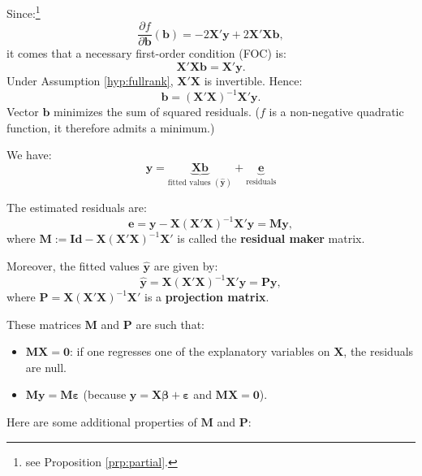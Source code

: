 \documentclass[
  11pt,
]{book}
\providecommand{\tightlist}{%
  \setlength{\itemsep}{0pt}\setlength{\parskip}{0pt}}
\theoremstyle{definition}
\theoremstyle{definition}
\theoremstyle{definition}
\theoremstyle{definition}
\theoremstyle{remark}
\begin{document}
Since:\footnote{see Proposition \ref{prp:partial}.}
\[
\frac{\partial f}{\partial \mathbf{b}}(\mathbf{b}) = - 2 \mathbf{X}'\mathbf{y} + 2 \mathbf{X}'\mathbf{X}\mathbf{b},
\]
it comes that a necessary first-order condition (FOC) is:
\begin{equation}
\mathbf{X}'\mathbf{X}\mathbf{b} = \mathbf{X}'\mathbf{y}.\label{eq:OLSFOC}
\end{equation}
Under Assumption \ref{hyp:fullrank}, \(\mathbf{X}'\mathbf{X}\) is invertible. Hence:
\[
\boxed{\mathbf{b} = (\mathbf{X}'\mathbf{X})^{-1} \mathbf{X}'\mathbf{y}.}
\]
Vector \(\mathbf{b}\) minimizes the sum of squared residuals. (\(f\) is a non-negative quadratic function, it therefore admits a minimum.)

We have:
\[
\mathbf{y} = \underbrace{\mathbf{X}\mathbf{b}}_{\mbox{fitted values } (\hat{\mathbf{y}})} + \underbrace{\mathbf{e}}_{\mbox{residuals}}
\]

The estimated residuals are:
\begin{equation}
\mathbf{e} = \mathbf{y} - \mathbf{X} (\mathbf{X}'\mathbf{X})^{-1} \mathbf{X}' \mathbf{y} = \mathbf{M} \mathbf{y},\label{eq:Mres}
\end{equation}
where \(\mathbf{M} := \mathbf{Id} - \mathbf{X} (\mathbf{X}'\mathbf{X})^{-1} \mathbf{X}'\) is called the \textbf{residual maker} matrix.

Moreover, the fitted values \(\hat{\mathbf{y}}\) are given by:
\begin{equation}
\hat{\mathbf{y}}=\mathbf{X} (\mathbf{X}'\mathbf{X})^{-1} \mathbf{X}' \mathbf{y} = \mathbf{P} \mathbf{y},\label{eq:Proj}
\end{equation}
where \(\mathbf{P}=\mathbf{X} (\mathbf{X}'\mathbf{X})^{-1} \mathbf{X}'\) is a \textbf{projection matrix}.

These matrices \(\mathbf{M}\) and \(\mathbf{P}\) are such that:

\begin{itemize}
\tightlist
\item
  \(\mathbf{M} \mathbf{X} = \mathbf{0}\): if one regresses one of the explanatory variables on \(\mathbf{X}\), the residuals are null.
\item
  \(\mathbf{M}\mathbf{y}=\mathbf{M}\boldsymbol\varepsilon\) (because \(\mathbf{y} = \mathbf{X}\boldsymbol\beta + \boldsymbol\varepsilon\) and \(\mathbf{M} \mathbf{X} = \mathbf{0}\)).
\end{itemize}

Here are some additional properties of \(\mathbf{M}\) and \(\mathbf{P}\):
\end{document}
